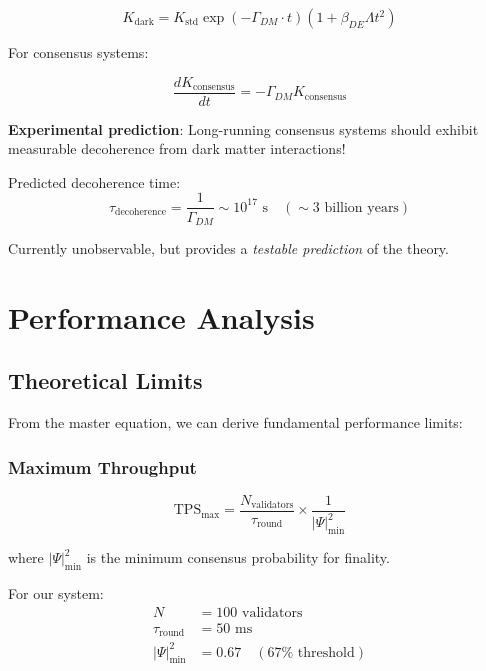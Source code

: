 \documentclass[11pt,a4paper,twoside]{article}
\begin{document}
\begin{equation}
K_{\text{dark}} = K_{\text{std}} \exp(-\Gamma_{DM} \cdot t) \left(1 + \beta_{DE} \Lambda t^2\right)
\end{equation}

For consensus systems:

\begin{equation}
\frac{dK_{\text{consensus}}}{dt} = -\Gamma_{DM} K_{\text{consensus}}
\end{equation}

\textbf{Experimental prediction}: Long-running consensus systems should exhibit measurable decoherence from dark matter interactions!

Predicted decoherence time:
\begin{equation}
\tau_{\text{decoherence}} = \frac{1}{\Gamma_{DM}} \sim 10^{17} \text{ s} \quad (\sim 3 \text{ billion years})
\end{equation}

Currently unobservable, but provides a \textit{testable prediction} of the theory.

\newpage

\section{Performance Analysis}

\subsection{Theoretical Limits}

From the master equation, we can derive fundamental performance limits:

\subsubsection{Maximum Throughput}

\begin{equation}
\text{TPS}_{\text{max}} = \frac{N_{\text{validators}}}{\tau_{\text{round}}} \times \frac{1}{|\Psi|^2_{\text{min}}}
\end{equation}

where $|\Psi|^2_{\text{min}}$ is the minimum consensus probability for finality.

For our system:
\begin{align}
N &= 100 \text{ validators} \\
\tau_{\text{round}} &= 50 \text{ ms} \\
|\Psi|^2_{\text{min}} &= 0.67 \quad (67\% \text{ threshold})
\end{align}
\end{document}
